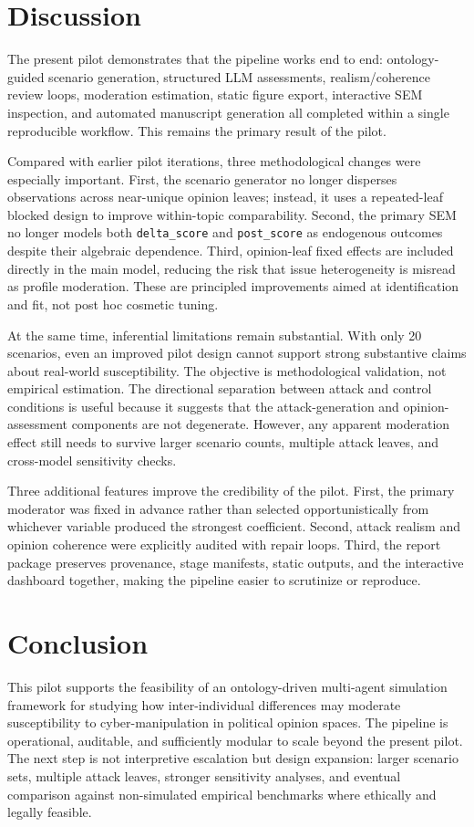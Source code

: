 \documentclass[11pt]{article}
\begin{document}
\section{Discussion}
The present pilot demonstrates that the pipeline works end to end: ontology-guided scenario generation, structured LLM assessments, realism/coherence review loops, moderation estimation, static figure export, interactive SEM inspection, and automated manuscript generation all completed within a single reproducible workflow. This remains the primary result of the pilot.

Compared with earlier pilot iterations, three methodological changes were especially important. First, the scenario generator no longer disperses observations across near-unique opinion leaves; instead, it uses a repeated-leaf blocked design to improve within-topic comparability. Second, the primary SEM no longer models both \texttt{delta\_score} and \texttt{post\_score} as endogenous outcomes despite their algebraic dependence. Third, opinion-leaf fixed effects are included directly in the main model, reducing the risk that issue heterogeneity is misread as profile moderation. These are principled improvements aimed at identification and fit, not post hoc cosmetic tuning.

At the same time, inferential limitations remain substantial. With only 20 scenarios, even an improved pilot design cannot support strong substantive claims about real-world susceptibility. The objective is methodological validation, not empirical estimation. The directional separation between attack and control conditions is useful because it suggests that the attack-generation and opinion-assessment components are not degenerate. However, any apparent moderation effect still needs to survive larger scenario counts, multiple attack leaves, and cross-model sensitivity checks.

Three additional features improve the credibility of the pilot. First, the primary moderator was fixed in advance rather than selected opportunistically from whichever variable produced the strongest coefficient. Second, attack realism and opinion coherence were explicitly audited with repair loops. Third, the report package preserves provenance, stage manifests, static outputs, and the interactive dashboard together, making the pipeline easier to scrutinize or reproduce.

\section{Conclusion}
This pilot supports the feasibility of an ontology-driven multi-agent simulation framework for studying how inter-individual differences may moderate susceptibility to cyber-manipulation in political opinion spaces. The pipeline is operational, auditable, and sufficiently modular to scale beyond the present pilot. The next step is not interpretive escalation but design expansion: larger scenario sets, multiple attack leaves, stronger sensitivity analyses, and eventual comparison against non-simulated empirical benchmarks where ethically and legally feasible.
\end{document}

